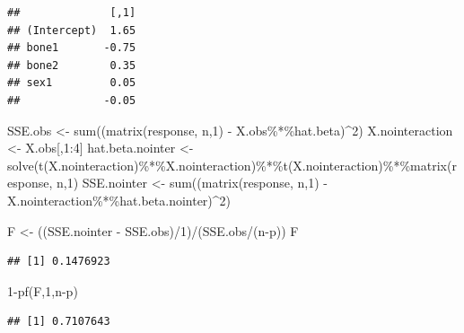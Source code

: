 \documentclass[
]{book}
\newenvironment{Shaded}{\begin{snugshade}}{\end{snugshade}}
\newcommand{\DecValTok}[1]{\textcolor[rgb]{0.00,0.00,0.81}{#1}}
\newcommand{\FunctionTok}[1]{\textcolor[rgb]{0.00,0.00,0.00}{#1}}
\newcommand{\NormalTok}[1]{#1}
\newcommand{\OtherTok}[1]{\textcolor[rgb]{0.56,0.35,0.01}{#1}}
\newcommand{\SpecialCharTok}[1]{\textcolor[rgb]{0.00,0.00,0.00}{#1}}
\begin{document}
\begin{verbatim}
##              [,1]
## (Intercept)  1.65
## bone1       -0.75
## bone2        0.35
## sex1         0.05
##             -0.05
\end{verbatim}

\begin{Shaded}
\begin{Highlighting}[]
\NormalTok{SSE.obs }\OtherTok{\textless{}{-}} \FunctionTok{sum}\NormalTok{((}\FunctionTok{matrix}\NormalTok{(response, n,}\DecValTok{1}\NormalTok{) }\SpecialCharTok{{-}}\NormalTok{ X.obs}\SpecialCharTok{\%*\%}\NormalTok{hat.beta)}\SpecialCharTok{\^{}}\DecValTok{2}\NormalTok{)}
\NormalTok{X.nointeraction }\OtherTok{\textless{}{-}}\NormalTok{ X.obs[,}\DecValTok{1}\SpecialCharTok{:}\DecValTok{4}\NormalTok{]}
\NormalTok{hat.beta.nointer }\OtherTok{\textless{}{-}} \FunctionTok{solve}\NormalTok{(}\FunctionTok{t}\NormalTok{(X.nointeraction)}\SpecialCharTok{\%*\%}\NormalTok{X.nointeraction)}\SpecialCharTok{\%*\%}\FunctionTok{t}\NormalTok{(X.nointeraction)}\SpecialCharTok{\%*\%}\FunctionTok{matrix}\NormalTok{(response, n,}\DecValTok{1}\NormalTok{)}
\NormalTok{SSE.nointer }\OtherTok{\textless{}{-}} \FunctionTok{sum}\NormalTok{((}\FunctionTok{matrix}\NormalTok{(response, n,}\DecValTok{1}\NormalTok{) }\SpecialCharTok{{-}}\NormalTok{ X.nointeraction}\SpecialCharTok{\%*\%}\NormalTok{hat.beta.nointer)}\SpecialCharTok{\^{}}\DecValTok{2}\NormalTok{)}

\NormalTok{F }\OtherTok{\textless{}{-}}\NormalTok{ ((SSE.nointer }\SpecialCharTok{{-}}\NormalTok{ SSE.obs)}\SpecialCharTok{/}\DecValTok{1}\NormalTok{)}\SpecialCharTok{/}\NormalTok{(SSE.obs}\SpecialCharTok{/}\NormalTok{(n}\SpecialCharTok{{-}}\NormalTok{p))}
\NormalTok{F}
\end{Highlighting}
\end{Shaded}

\begin{verbatim}
## [1] 0.1476923
\end{verbatim}

\begin{Shaded}
\begin{Highlighting}[]
\DecValTok{1}\SpecialCharTok{{-}}\FunctionTok{pf}\NormalTok{(F,}\DecValTok{1}\NormalTok{,n}\SpecialCharTok{{-}}\NormalTok{p)}
\end{Highlighting}
\end{Shaded}

\begin{verbatim}
## [1] 0.7107643
\end{verbatim}
\end{document}
